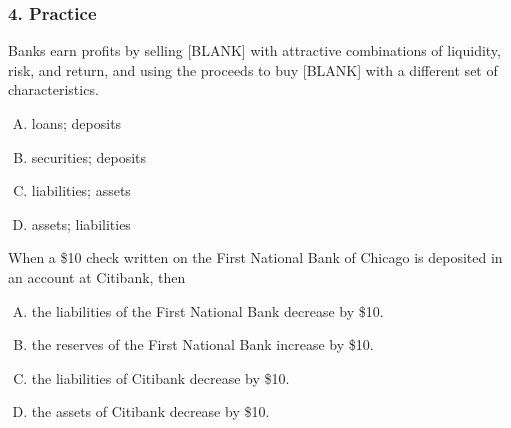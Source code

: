 \documentclass{beamer}
\begin{document}
\begin{practiceframe}
\frametitle{4. Practice}
\vspace{-1em}

    Banks earn profits by selling [BLANK] with attractive combinations of liquidity, risk, and return, and using the proceeds to buy [BLANK] with a different set of characteristics.
    \begin{enumerate}[A. ]
        \item loans; deposits
        \item securities; deposits
        \item liabilities; assets
        \item assets; liabilities
    \end{enumerate}

    When a \$10 check written on the First National Bank of Chicago is deposited in an account at Citibank, then
    \begin{enumerate}[A. ]
        \item the liabilities of the First National Bank decrease by \$10.
        \item the reserves of the First National Bank increase by \$10.
        \item the liabilities of Citibank decrease by \$10.
        \item the assets of Citibank decrease by \$10.
    \end{enumerate}

\end{practiceframe}
\end{document}
